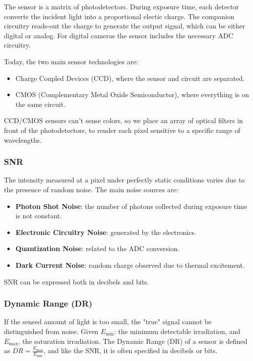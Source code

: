 \documentclass{article}
\begin{document}
The sensor is a matrix of photodetectors.
During exposure time, each detector converts the incident light into a proportional electic charge.
The companion circuitry reads-out the charge to generate the output signal, which can be either digital or analog.
For digital cameras the sensor includes the necessary ADC circuitry.

Today, the two main sensor technologies are:
\begin{itemize}
  \item Charge Coupled Devices (CCD), where the sensor and circuit are separated.
  \item CMOS (Complementary Metal Oxide Semiconductor), where everything is on the same circuit.
\end{itemize}

CCD/CMOS sensors can't sense colors, so we place an array of optical filters in front of the photodetectors, to render each pixel sensitive to a specific range of wavelengths.

\subsubsection{SNR}

The intensity measured at a pixel under perfectly static conditions varies due to the presence of random noise.
The main noise sources are:
\begin{itemize}
  \item \textbf{Photon Shot Noise}: the number of photons collected during exposure time is not constant.
  \item \textbf{Electronic Circuitry Noise}: generated by the electronics.
  \item \textbf{Quantization Noise}: related to the ADC conversion.
  \item \textbf{Dark Current Noise}: random charge observed due to thermal excitement.
\end{itemize}

SNR can be expressed both in decibels and bits.

\subsubsection{Dynamic Range (DR)}
If the sensed amount of light is too small, the "true" signal cannot be distinguished from noise.
Given $E_{\text{min}}$: the minimum detectable irradiation, and $E_{\text{max}}$, the saturation irradiation.
The Dynamic Range (DR) of a sensor is defined as $DR = \frac{E_{\text{max}}}{E_{\text{min}}}$, and like the SNR, it is often specified in decibels or bits.
\end{document}
